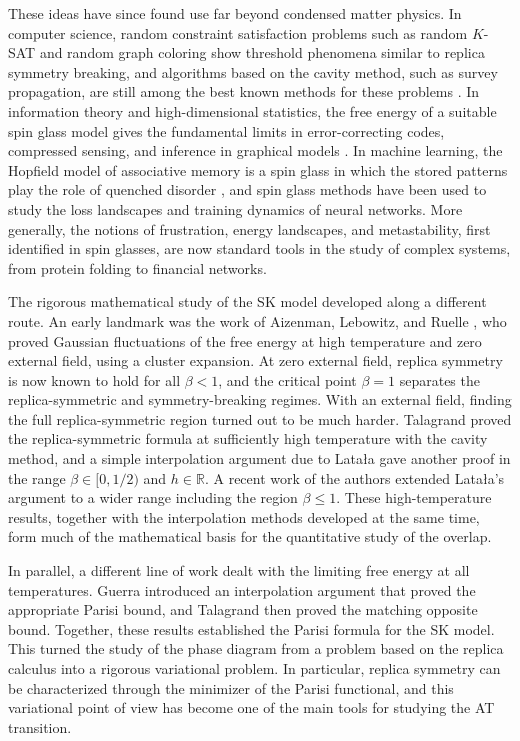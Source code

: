 \documentclass[11pt]{article}
\numberwithin{equation}{section}
\newcommand{\R}{\mathbb{R}}
\newcommand{\1}{\mathbf 1}
\begin{document}
These ideas have since found use far beyond condensed matter physics. In computer science, random constraint satisfaction problems such as random $K$-SAT and random graph coloring show threshold phenomena similar to replica symmetry breaking, and algorithms based on the cavity method, such as survey propagation, are still among the best known methods for these problems \cite{MezardParisiZecchina2002,MezardMontanari2009}. In information theory and high-dimensional statistics, the free energy of a suitable spin glass model gives the fundamental limits in error-correcting codes, compressed sensing, and inference in graphical models \cite{Nishimori2001,ZdeborovaKrzakala2016}. In machine learning, the Hopfield model of associative memory is a spin glass in which the stored patterns play the role of quenched disorder \cite{Hopfield1982,AmitGutfreundSompolinsky1985}, and spin glass methods have been used to study the loss landscapes and training dynamics of neural networks. More generally, the notions of frustration, energy landscapes, and metastability, first identified in spin glasses, are now standard tools in the study of complex systems, from protein folding to financial networks.

The rigorous mathematical study of the SK model developed along a different route. An early landmark was the work of Aizenman, Lebowitz, and Ruelle \cite{AizenmanLebowitzRuelle1987}, who proved Gaussian fluctuations of the free energy at high temperature and zero external field, using a cluster expansion. At zero external field, replica symmetry is now known to hold for all $\beta<1$, and the critical point $\beta=1$ separates the replica-symmetric and symmetry-breaking regimes. With an external field, finding the full replica-symmetric region turned out to be much harder. Talagrand proved the replica-symmetric formula at sufficiently high temperature with the cavity method, and a simple interpolation argument due to Lata\l{}a gave another proof in the range $\beta \in [0,1/2)$ and $h\in \R$. A recent work of the authors extended Lata\l{}a's argument to a wider range including the region $\beta\leq 1$. These high-temperature results, together with the interpolation methods developed at the same time, form much of the mathematical basis for the quantitative study of the overlap.

In parallel, a different line of work dealt with the limiting free energy at all temperatures. Guerra introduced an interpolation argument that proved the appropriate Parisi bound, and Talagrand then proved the matching opposite bound. Together, these results established the Parisi formula for the SK model. This turned the study of the phase diagram from a problem based on the replica calculus into a rigorous variational problem. In particular, replica symmetry can be characterized through the minimizer of the Parisi functional, and this variational point of view has become one of the main tools for studying the AT transition.
\end{document}
